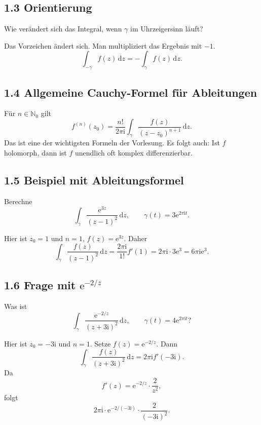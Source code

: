 \documentclass[11pt,a4paper]{article}
\newcommand{\N}{\mathbb N}
\newcommand{\ii}{\mathrm i}
\newcommand{\ee}{\mathrm e}
\newcommand{\dd}{\,\mathrm d}
\begin{document}
\subsection{1.3 Orientierung}
\begin{fragebox}
Wie verändert sich das Integral, wenn $\gamma$ im Uhrzeigersinn läuft?
\end{fragebox}
\begin{antwortbox}
Das Vorzeichen ändert sich. Man multipliziert das Ergebnis mit $-1$.
\[
\int_{-\gamma} f(z)\dd z=-\int_\gamma f(z)\dd z.
\]
\end{antwortbox}

\subsection{1.4 Allgemeine Cauchy-Formel für Ableitungen}
\begin{importantbox}
Für $n\in\N_0$ gilt
\[
f^{(n)}(z_0)=\frac{n!}{2\pi\ii}\int_\gamma\frac{f(z)}{(z-z_0)^{n+1}}\dd z.
\]
Das ist eine der wichtigsten Formeln der Vorlesung. Es folgt auch: Ist $f$ holomorph, dann ist $f$ unendlich oft komplex differenzierbar.
\end{importantbox}

\subsection{1.5 Beispiel mit Ableitungsformel}
\begin{beispielbox}
Berechne
\[
\int_\gamma \frac{\ee^{3z}}{(z-1)^2}\dd z,
\qquad \gamma(t)=3\ee^{2\pi\ii t}.
\]
\end{beispielbox}
Hier ist $z_0=1$ und $n=1$, $f(z)=\ee^{3z}$. Daher
\[
\int_\gamma \frac{f(z)}{(z-1)^2}\dd z=\frac{2\pi\ii}{1!}f'(1)
=2\pi\ii\cdot3\ee^3=6\pi\ii\ee^3.
\]

\subsection{1.6 Frage mit $\ee^{-2/z}$}
\begin{fragebox}
Was ist
\[
\int_\gamma \frac{\ee^{-2/z}}{(z+3\ii)^2}\dd z,
\qquad \gamma(t)=4\ee^{2\pi\ii t}?
\]
\end{fragebox}
\begin{antwortbox}
Hier ist $z_0=-3\ii$ und $n=1$. Setze $f(z)=\ee^{-2/z}$. Dann
\[
\int_\gamma \frac{f(z)}{(z+3\ii)^2}\dd z=2\pi\ii f'(-3\ii).
\]
Da
\[
f'(z)=\ee^{-2/z}\cdot\frac{2}{z^2},
\]
folgt
\[
2\pi\ii\cdot \ee^{-2/(-3\ii)}\cdot\frac{2}{(-3\ii)^2}.
\]
\end{antwortbox}
\end{document}
